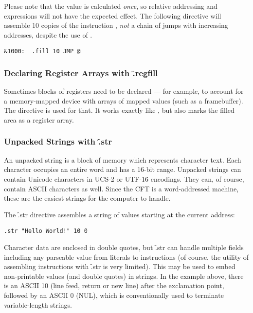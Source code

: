 Please note that the value is calculated {\em once}, so relative addressing and
expressions will not have the expected effect. The following directive will
assemble 10 copies of the instruction , {\em not\/} a chain of jumps
with increasing addresses, despite the use of .

\begin{lstlisting}[language=cftasm,numbers=none]
&1000:  .fill 10 JMP @
\end{lstlisting}



\subsubsection{Declaring Register Arrays with \f{.regfill}}

Sometimes blocks of registers need to be declared — for example, to account for
a memory-mapped device with arrays of mapped values (such as a
framebuffer). The  directive is used for that. It works exactly
like , but also marks the filled area as a register array.



\subsubsection{Unpacked Strings with \f{.str}}

An unpacked string is a block of memory which represents character text. Each
character occupies an entire word and has a 16-bit range. Unpacked strings can
contain Unicode characters in UCS-2 or UTF-16 encodings. They can, of course,
contain ASCII characters as well. Since the CFT is a word-addressed machine,
these are the easiest strings for the computer to handle.

The \f{.str} directive assembles a string of values starting at the current
address:

\begin{lstlisting}[language=cftasm,numbers=none]
.str "Hello World!" 10 0
\end{lstlisting}

Character data are enclosed in double quotes, but \f{.str} can handle multiple
fields including any parseable value from literals to instructions (of course,
the utility of assembling instructions with \f{.str} is very limited). This may
be used to embed non-printable values (and double quotes) in strings. In the
example above, there is an ASCII 10 (line feed, return or new line) after the
exclamation point, followed by an ASCII 0 (NUL), which is conventionally used
to terminate variable-length strings.

